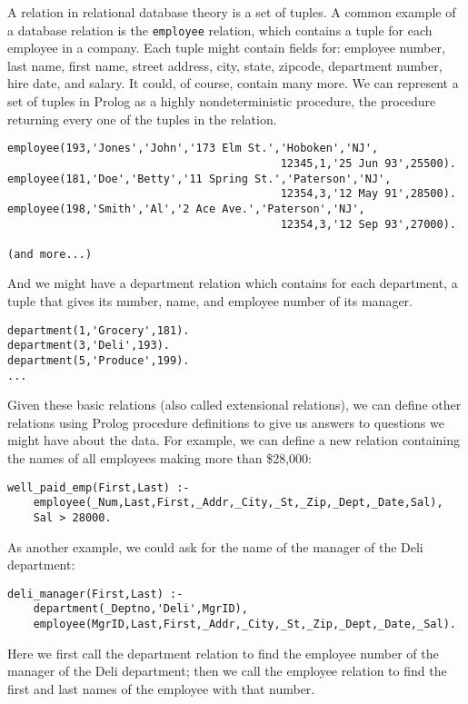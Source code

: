 A relation in relational database theory is a set of tuples.  A common
example of a database relation is the \verb|employee| relation, which
contains a tuple for each employee in a company.  Each tuple might
contain fields for: employee number, last name, first name, street
address, city, state, zipcode, department number, hire date, and
salary.  It could, of course, contain many more.  We can represent a
set of tuples in Prolog as a highly nondeterministic procedure, the
procedure returning every one of the tuples in the relation.
\begin{verbatim}
employee(193,'Jones','John','173 Elm St.','Hoboken','NJ',
                                          12345,1,'25 Jun 93',25500).
employee(181,'Doe','Betty','11 Spring St.','Paterson','NJ',
                                          12354,3,'12 May 91',28500).
employee(198,'Smith','Al','2 Ace Ave.','Paterson','NJ',
                                          12354,3,'12 Sep 93',27000).

(and more...)
\end{verbatim}

And we might have a department relation which contains for each
department, a tuple that gives its number, name, and employee number
of its manager.

\begin{verbatim}
department(1,'Grocery',181).
department(3,'Deli',193).
department(5,'Produce',199).
...
\end{verbatim}

Given these basic relations (also called extensional relations), we
can define other relations using Prolog procedure definitions to give
us answers to questions we might have about the data.  For example, we
can define a new relation containing the names of all employees making
more than \$28,000:
\begin{verbatim}
well_paid_emp(First,Last) :-
    employee(_Num,Last,First,_Addr,_City,_St,_Zip,_Dept,_Date,Sal),
    Sal > 28000.
\end{verbatim}

As another example, we could ask for the name of the manager of the
Deli department:
\begin{verbatim}
deli_manager(First,Last) :- 
    department(_Deptno,'Deli',MgrID),
    employee(MgrID,Last,First,_Addr,_City,_St,_Zip,_Dept,_Date,_Sal).
\end{verbatim}
Here we first call the department relation to find the employee number
of the manager of the Deli department; then we call the employee
relation to find the first and last names of the employee with that
number.

